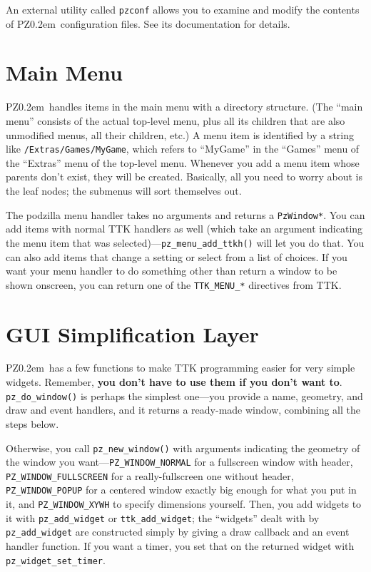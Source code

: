 \documentclass[12pt,letterpaper]{report}
\def\pz{{\footnotesize PZ}}
\def\pzt{\pz\kern0.2em{\large\oldstyle2}}
\begin{document}
An external utility called \verb|pzconf| allows you to examine and modify the contents of
\pzt\ configuration files. See its documentation for details.

\section{Main Menu}
\pzt\ handles items in the main menu with a directory structure. (The ``main menu'' consists
of the actual top-level menu, plus all its children that are also unmodified menus, all their
children, etc.) A menu item is identified by a string like \verb|/Extras/Games/MyGame|, which
refers to ``MyGame'' in the ``Games'' menu of the ``Extras'' menu of the top-level menu.
Whenever you add a menu item whose parents don't exist, they will be created. Basically, all
you need to worry about is the leaf nodes; the submenus will sort themselves out.

The podzilla menu handler takes no arguments and returns a \verb|PzWindow*|. You can add items with
normal TTK handlers as well (which take an argument indicating the menu item that was
selected)---\verb|pz_menu_add_ttkh()| will let you do that. You can also add items that change
a setting or select from a list of choices. If you want your menu handler to do something
other than return a window to be shown onscreen, you can return one of the \verb|TTK_MENU_*| directives
from TTK.

\section{GUI Simplification Layer}
\pzt\ has a few functions to make TTK programming easier for very simple widgets.
Remember, {\bf you don't have to use them if you don't want to}.
\verb|pz_do_window()| is perhaps the simplest one---you provide a name, geometry, and
draw and event handlers, and it returns a ready-made window, combining all the steps below.

Otherwise, you call \verb|pz_new_window()| with arguments indicating the geometry of the
window you want---\verb|PZ_WINDOW_NORMAL| for a fullscreen window with header,
\verb|PZ_WINDOW_FULLSCREEN| for a really-fullscreen one without header, \verb|PZ_WINDOW_POPUP|
for a centered window exactly big enough for what you put in it, and \verb|PZ_WINDOW_XYWH|
to specify dimensions yourself. Then, you add widgets to it with \verb|pz_add_widget| or
\verb|ttk_add_widget|; the ``widgets'' dealt with by \verb|pz_add_widget| are constructed
simply by giving a draw callback and an event handler function. If you want a timer,
you set that on the returned widget with \verb|pz_widget_set_timer|.
\end{document}
